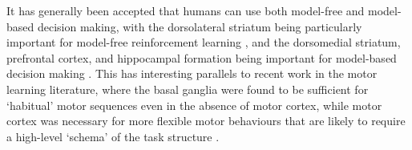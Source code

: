 It has generally been accepted that humans can use both model-free and model-based decision making, with the dorsolateral striatum being particularly important for model-free reinforcement learning \citep{yin2004lesions, yin2005role}, and the dorsomedial striatum, prefrontal cortex, and hippocampal formation being important for model-based decision making \citep{vikbladh2019hippocampal,geerts2020general,miller2017dorsal,niv2009reinforcement,killcross2003coordination}.
This has interesting parallels to recent work in the motor learning literature, where the basal ganglia were found to be sufficient for `habitual' motor sequences even in the absence of motor cortex, while motor cortex was necessary for more flexible motor behaviours that are likely to require a high-level `schema' of the task structure \citep{mizes2023motor,mizes2023dissociating}.


